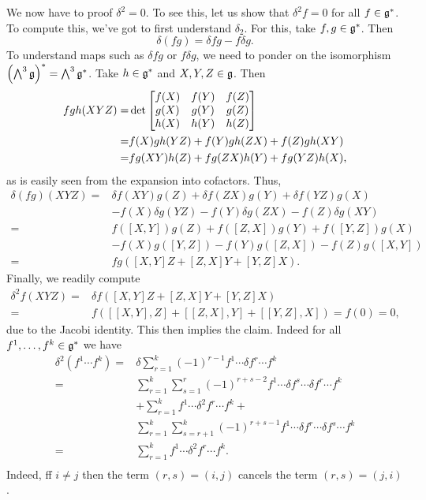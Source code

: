 We now have to proof $\delta^2=0$. To see this, let us show that $\delta^2f=0$ for all $f\in\mathfrak{g}^*$. To compute this, we've got to first understand $\delta_2$. For this, take $f,g\in\mathfrak{g}^*$. Then
\begin{equation}
\delta(fg)=\delta fg-f\delta g.
\end{equation} 
To understand maps such as $\delta f g$ or $f\delta g$, we need to ponder on the isomorphism $\qty(\bigwedge^3\mathfrak{g})^*=\bigwedge^3\mathfrak{g}^*$. Take $h\in\mathfrak{g}^*$ and $X,Y,Z\in\mathfrak{g}$. Then
\begin{equation}
\begin{aligned}
fgh(XYZ)=&\det\mqty[f(X) & f(Y) & f(Z)\\
g(X) & g(Y) & g(Z)\\
h(X) & h(Y) & h(Z)]\\
=&f(X)gh(YZ)+f(Y)gh(ZX)+f(Z)gh(XY)\\
=&fg(XY)h(Z)+fg(ZX)h(Y)+fg(YZ)h(X),
\end{aligned}
\end{equation}
as is easily seen from the expansion into cofactors. Thus,
\begin{equation}
\begin{aligned}
\delta(fg)(XYZ)=&\delta f(XY)g(Z)+\delta f(ZX)g(Y)+\delta f(YZ)g(X)\\
&-f(X)\delta g(YZ)-f(Y)\delta g(ZX)-f(Z)\delta g(XY)\\
=&f([X,Y])g(Z)+f([Z,X])g(Y)+f([Y,Z])g(X)\\
&-f(X)g([Y,Z])-f(Y)g([Z,X])-f(Z)g([X,Y])\\
=&fg([X,Y]Z+[Z,X]Y+[Y,Z]X).
\end{aligned}
\end{equation} 
Finally, we readily compute
\begin{equation}
\begin{aligned}
\delta^2f(XYZ)=&\delta f([X,Y]Z+[Z,X]Y+[Y,Z]X)\\
=&f([[X,Y],Z]+[[Z,X],Y]+[[Y,Z],X])=f(0)=0,
\end{aligned}
\end{equation}
due to the Jacobi identity. This then implies the claim. Indeed for all $f^1,\dots,f^k\in\mathfrak{g}^*$ we have
\begin{equation}\label{eq:differential_property}
\begin{aligned}
\delta^2(f^1\cdots f^k)=&\delta\sum_{r=1}^k (-1)^{r-1} f^1\cdots\delta f^r\cdots f^k\\
=&\sum_{r=1}^k\sum_{s=1}^r (-1)^{r+s-2} f^1\cdots\delta f^s\cdots\delta f^r\cdots f^k\\
&+\sum_{r=1}^kf^1\cdots\delta^2f^r\cdots f^k+\\
&\sum_{r=1}^k\sum_{s=r+1}^k (-1)^{r+s-1} f^1\cdots\delta f^r\cdots\delta f^s\cdots f^k\\
=&\sum_{r=1}^kf^1\cdots\delta^2f^r\cdots f^k.\\
\end{aligned}
\end{equation}
Indeed, ff $i\neq j$ then the term $(r,s)=(i,j)$ cancels the term $(r,s)=(j,i)$.

